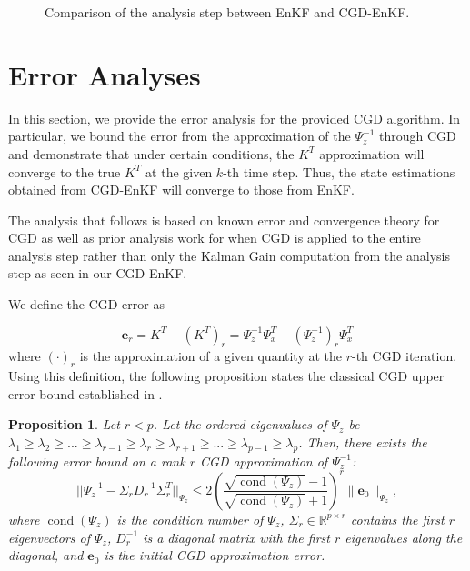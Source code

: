 \documentclass[11p]{elsarticle}
\numberwithin{equation}{section}
\newtheorem{proposition}{Proposition}
\newcommand{\vect}[1]{\ensuremath{\bm{#1}}}
\begin{document}
\begin{figure}[htbp]
\begin{tikzpicture}[node distance=1cm, scale=0.65, transform shape]
  \end{tikzpicture}
  
  \vspace{0.5cm}
  \caption{Comparison of the analysis step between EnKF and CGD-EnKF.}
  \label{fig:comparison_CG}
\end{figure}


\section{Error Analyses}
\label{sec:errorAnalysis}

In this section, we provide the error analysis for the provided CGD algorithm. In particular, we bound the error from the approximation of the $\Psi_{z}^{-1}$ through CGD and demonstrate that under certain conditions, the $K^T$ approximation will converge to the true $K^T$ at the given $k$-th time step.  
Thus, the state estimations obtained from CGD-EnKF will converge to those from EnKF.  

The analysis that follows is based on known error and convergence theory for CGD \cite{Shewchuk1994} as well as prior analysis work for when CGD is applied to the entire analysis step \cite{Bardsley2013,Bardsley2013-2} rather than only the Kalman Gain computation from the analysis step as seen in our CGD-EnKF.

We define the CGD error as

\begin{equation}
    \vect{e}_r = K^T - (K^T)_r = \Psi_{z}^{-1}\Psi_{x}^T - (\Psi_{z}^{-1})_r\Psi_{x}^T
    \label{eq:e_r_def}
\end{equation}
where $(\cdot)_r$ is the approximation of a given quantity at the $r$-th CGD iteration.  Using this definition, the following proposition states the classical CGD upper error bound established in \cite{Shewchuk1994}.
\begin{proposition}
Let $r<p$.  Let the ordered eigenvalues of 
    $\Psi_{z}$ be $\lambda_1 \geq \lambda_2 \geq ... \geq \lambda_{r-1} \geq \lambda_r \geq \lambda_{r+1} \geq ... \geq \lambda_{p-1} \geq \lambda_p$. Then, there exists the following error bound on a rank $r$ CGD approximation of $\Psi_{z}^{-1}$:
    \begin{equation}
    ||\Psi_{z}^{-1} - \Sigma_r D_r^{-1} \Sigma_r^T||_{\Psi_{z}} \leq 2(\frac{\sqrt{\operatorname{cond}(\Psi_{z})} - 1}{\sqrt{\operatorname{cond}(\Psi_{z})} +1})^r \| \vect{e}_0\|_{\Psi_{z}},
    \label{eqn:prop1}
    \end{equation}
where $\operatorname{cond}(\Psi_{z})$ is the condition number of $\Psi_{z}$, $\Sigma_r \in \mathbb{R}^{p \times r}$ contains the first $r$ eigenvectors of $\Psi_{z}$, $D_r^{-1}$ is a diagonal matrix with the first $r$ eigenvalues along the diagonal, and $\vect{e}_0$ is the initial CGD approximation error.
\label{prop:1}
\end{proposition}
\end{document}
